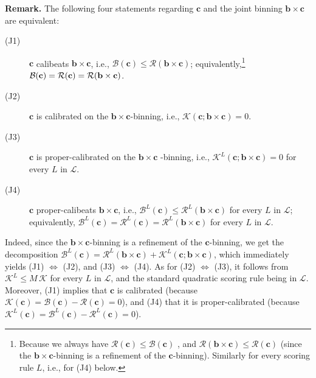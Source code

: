 \documentclass[12pt,a4paper,notitlepage]{article}
\begin{document}
\bigskip \bigskip

\noindent \textbf{Remark. }The following four statements regarding $\mathbf{c%
}$ and the joint binning $\mathbf{b}\times \mathbf{c}$ are equivalent:

\begin{description}
\item[(J1)] $\mathbf{c}$ calibeats $\mathbf{b}\times \mathbf{c}$, i.e., $%
\mathcal{B}(\mathbf{c})\leq \mathcal{R}(\mathbf{b}\times \mathbf{c})$;
equivalently,\footnote{%
Because we always have $\mathcal{R}(\mathbf{c})\leq \mathcal{B}(\mathbf{c})$%
, and $\mathcal{R}(\mathbf{b}\times \mathbf{c})\leq \mathcal{R}(\mathbf{c})$
(since the $\mathbf{b}\times \mathbf{c}$-binning is a refinement of the $%
\mathbf{c}$-binning). Similarly for every scoring rule $L$, i.e., for (J4)
below.} $\mathcal{B}(\mathbf{c})=\mathcal{R}(\mathbf{c})=\mathcal{R}(\mathbf{%
b}\times \mathbf{c})$.

\item[(J2)] $\mathbf{c}$ is calibrated on the $\mathbf{b\times c}$-binning,
i.e., $\mathcal{K}(\mathbf{c};\mathbf{b}\times \mathbf{c})=0$.

\item[(J3)] $\mathbf{c}$ is proper-calibrated on the $\mathbf{b\times c}$%
-binning, i.e., $\mathcal{K}^{L}(\mathbf{c};\mathbf{b}\times \mathbf{c})=0$
for every $L$ in $\mathcal{L}$.

\item[(J4)] $\mathbf{c}$ proper-calibeats $\mathbf{b\times c}$, i.e., $%
\mathcal{B}^{L}(\mathbf{c})\leq \mathcal{R}^{L}(\mathbf{b}\times \mathbf{c})$
for every $L$ in $\mathcal{L}$; equivalently, $\mathcal{B}^{L}(\mathbf{c})=%
\mathcal{R}^{L}(\mathbf{c})=\mathcal{R}^{L}(\mathbf{b}\times \mathbf{c})$
for every $L$ in $\mathcal{L}$.
\end{description}

\noindent Indeed, since the $\mathbf{b}\times \mathbf{c}$-binning is a
refinement of the $\mathbf{c}$-binning, we get the decomposition $\mathcal{B}%
^{L}(\mathbf{c})=\mathcal{R}^{L}(\mathbf{b}\times \mathbf{c})+\mathcal{K}%
^{L}(\mathbf{c};\mathbf{b}\times \mathbf{c})$, which immediately yields (J1) 
$\Longleftrightarrow $ (J2), and (J3) $\Longleftrightarrow $ (J4). As for
(J2) $\Longleftrightarrow $ (J3), it follows from $\mathcal{K}^{L}\leq M\,%
\mathcal{K}$ for every $L$ in $\mathcal{L}$, and the standard quadratic
scoring rule being in $\mathcal{L}$. Moreover, (J1) implies that $\mathbf{c}$
is calibrated (because $\mathcal{K}(\mathbf{c})=\mathcal{B}(\mathbf{c})-%
\mathcal{R}(\mathbf{c})=0$), and (J4) that it is proper-calibrated (because $%
\mathcal{K}^{L}(\mathbf{c})=\mathcal{B}^{L}(\mathbf{c})-\mathcal{R}^{L}(%
\mathbf{c})=0$).
\end{document}
